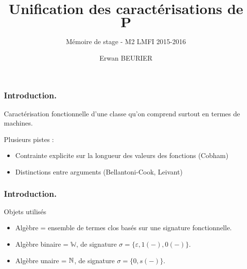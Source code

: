 \documentclass[10pt]{beamer}
\author{Erwan BEURIER}
\title{Unification des caractérisations de $\textbf{P}$}
\subtitle{Mémoire de stage - M2 LMFI 2015-2016}
\newcommand{\bbW}{\mathbb{W}}
\begin{document}
    \begin{frame}
		\titlepage
    \end{frame}


	\begin{frame}
		\frametitle{Introduction.}
		
		\begin{block}
			
			Caractérisation fonctionnelle d'une classe qu'on comprend surtout en termes de machines.
			
			\pause 

			Plusieurs pistes : 
			\begin{itemize}
				\item 	Contrainte explicite sur la longueur des valeurs des fonctions (Cobham)
				\item 	Distinctions entre arguments (Bellantoni-Cook, Leivant)
			\end{itemize}
			
%			
%			
		\end{block}
	\end{frame}
	
	\begin{frame}
		\frametitle{Introduction.}
		
		\begin{block}{Objets utilisés}
			\begin{itemize}
				\item 	Algèbre = ensemble de termes clos basés sur une signature fonctionnelle.
				\pause
				\item 	Algèbre binaire = $\bbW$, de signature $\sigma = \{\varepsilon, 1(-), 0(-) \}$.
				\item 	Algèbre unaire = $\mathbb{N}$, de signature $\sigma = \{ 0, s(-) \}$.
			\end{itemize}
		\end{block}
	\end{frame}
	
\end{document}
